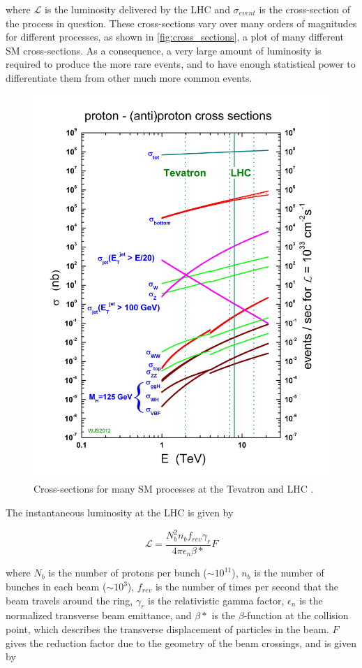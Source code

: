 where $\mathcal{L}$ is the luminosity delivered by the \ac{LHC} and $\sigma_{event}$ is the cross-section of the process in question. These cross-sections vary over many orders of magnitudes for different processes, as shown in \autoref{fig:cross_sections}, a plot of many different \ac{SM} cross-sections. As a consequence, a very large amount of luminosity is required to produce the more rare events, and to have enough statistical power to differentiate them from other much more common events.   

\begin{centering}
\begin{figure}[!hbt]
\myfloatalign
\includegraphics[width=.60\linewidth]{figures/lhc/crosssections2013.jpg}
\caption{Cross-sections for many \ac{SM} processes at the Tevatron and \ac{LHC} \cite{crosssections}.}
\label{fig:cross_sections}
\end{figure}
\end{centering}

The instantaneous luminosity at the \ac{LHC} is given by

\begin{equation}
\mathcal{L} = \frac{ N^2_b n_b f_{rev} \gamma_r }{ 4\pi \epsilon_n \beta* } F
\end{equation}

where $N_b$ is the number of protons per bunch ($\sim10^11$), $n_b$ is the number of bunches in each beam ($\sim10^3$), $f_{rev}$ is the number of times per second that the beam travels around the ring, $\gamma_r$ is the relativistic gamma factor, $\epsilon_n$ is the normalized transverse beam emittance, and $\beta*$ is the $\beta$-function at the collision point, which describes the transverse displacement of particles in the beam. $F$ gives the reduction factor due to the geometry of the beam crossings, and is given by

